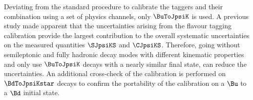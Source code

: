 Deviating from the standard procedure to calibrate the \OS taggers and their
combination using a set of physics channels, only $\BuToJpsiK$ is used. A
previous study \cite{Aaij:1497268} made apparent that the uncertainties arising
from the flavour tagging calibration provide the largest contribution to the
overall systematic uncertainties on the measured quantities $\SJpsiKS$ and
$\CJpsiKS$. Therefore, going without semileptonic and fully hadronic decay modes
with different kinematic properties and only use $\BuToJpsiK$ decays with a
nearly similar final state, can reduce the uncertainties. An additional
cross-check of the calibration is performed on $\BdToJpsiKstar$ decays to
confirm the portability of the calibration on a $\Bu$ to a $\Bd$ initial state.

